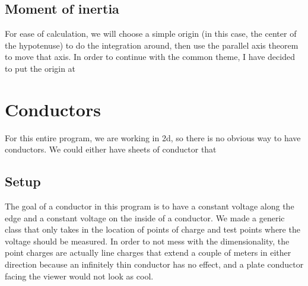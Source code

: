 \documentclass{article}
\begin{document}
\subsection{Moment of inertia}
For ease of calculation, we will choose a simple origin (in this case, the center of the hypotenuse) to do the integration around, then use the parallel axis theorem to move that axis. In order to continue with the common theme, I have decided to put the origin at

\section{Conductors}
For this entire program, we are working in 2d, so there is no obvious way to have conductors. We could either have sheets of conductor that
\subsection{Setup}
The goal of a conductor in this program is to have a constant voltage along the edge and a constant voltage on the inside of a conductor. We made a generic class that only takes in the location of points of charge and test points where the voltage should be measured. In order to not mess with the dimensionality, the point charges are actually line charges that extend a couple of meters in either direction because an infinitely thin conductor has no effect, and a plate conductor facing the viewer would not look as cool.
\end{document}
